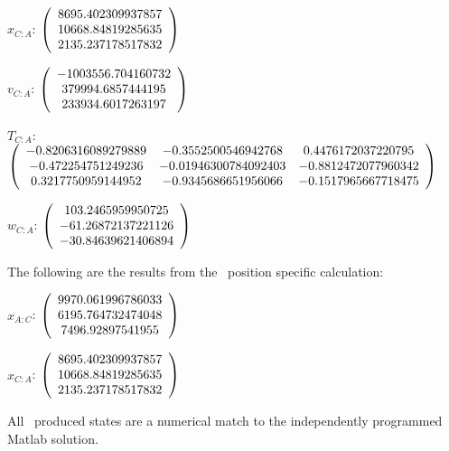 \begin{description}
$x_{C:A}$: $\left( \begin{array} {ccc} 8695.402309937857 \\     10668.84819285635 \\     2135.237178517832
\end{array} \right)\\ \\$

$v_{C:A}$:  $\left( \begin{array} {ccc} -1003556.704160732 \\     379994.6857444195 \\     233934.6017263197
\end{array} \right)\\ \\$

$T_{C:A}$: $\left( \begin{array} {ccc}
 -0.8206316089279889 &   -0.3552500546942768 &    0.4476172037220795 \\
  -0.472254751249236 &  -0.01946300784092403 &   -0.8812472077960342 \\
  0.3217750959144952 &   -0.9345686651956066 &   -0.1517965667718475 \\
\end{array} \right)\\ \\$

$w_{C:A}$:  $\left( \begin{array} {ccc} 103.2465959950725 \\    -61.26872137221126 \\    -30.84639621406894
\end{array} \right)\\ \\$


The following are the results from the \ position specific calculation:

$x_{A:C}$: $\left( \begin{array} {ccc} 9970.061996786033 \\     6195.764732474048 \\      7496.92897541955
\end{array} \right)\\ \\$

$x_{C:A}$: $\left( \begin{array} {ccc} 8695.402309937857 \\     10668.84819285635 \\     2135.237178517832
\end{array} \right)\\ \\$

All \ produced states are a numerical match to the independently programmed Matlab solution.

\end{description}

